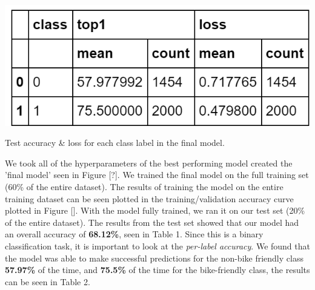 \documentclass[10pt,twocolumn,letterpaper]{article}
\begin{document}
\begin{table}[t]
\begin{center}
	\includegraphics[width=0.7\linewidth]{final_acc_by_label_table.png}
\end{center}
   \caption{Test accuracy \& loss for each class label in the final model.}
\label{tab:long}
\label{fig:onecol}
\end{table}

We took all of the hyperparameters of the best performing model created the 'final model' seen in Figure [?]. We trained the final model on the full training set (60\% of the entire dataset). The results of training the model on the entire training dataset can be seen plotted in the training/validation accuracy curve plotted in Figure []. With the model fully trained, we ran it on our test set (20\% of the entire dataset). The results from the test set showed that our model had an overall accuracy of \textbf{68.12\%}, seen in Table 1. Since this is a binary classification task, it is important to look at the \textit{per-label accuracy}. We found that the model was able to make successful predictions for the non-bike friendly class \textbf{57.97\%} of the time, and \textbf{75.5\%} of the time for the bike-friendly class, the results can be seen in Table 2. 




\end{document}
